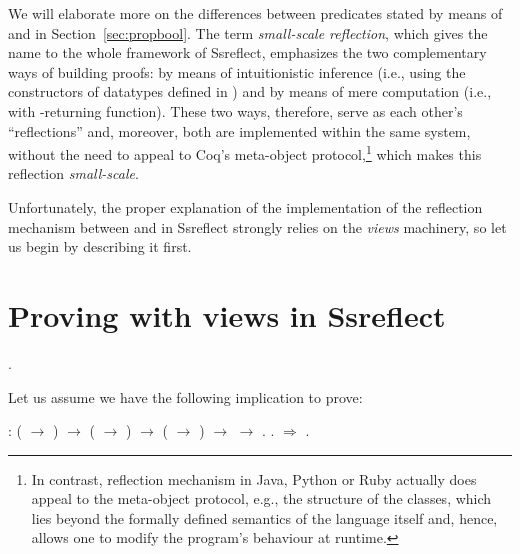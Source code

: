 We will elaborate more on the differences between predicates stated by
means of  and  in Section~\ref{sec:propbool}. The term
\textit{small-scale reflection}, which gives the name to the whole framework
of Ssreflect, emphasizes the two complementary ways of building
proofs: by means of intuitionistic inference (i.e., using the
constructors of datatypes defined in ) and by means of mere
computation (i.e., with -returning function). These two ways,
therefore, serve as each other's ``reflections'' and, moreover, both are
implemented within the same system, without the need to appeal to
Coq's meta-object protocol,\footnote{In contrast, reflection
mechanism in Java, Python or Ruby actually does appeal to the
meta-object protocol, e.g.,  the structure
of the classes, which lies beyond the formally defined semantics of
the language itself and, hence, allows one to modify the program's
behaviour at runtime.} which makes this reflection \textit{small-scale}.


Unfortunately, the proper explanation of the implementation of the
reflection mechanism between  and  in Ssreflect strongly
relies on the \textit{views} machinery, so let us begin by describing it
first.


\newpage


\section{Proving with views in Ssreflect}


\label{sec:views}


\begin{coqdoccode}
\coqdocemptyline
\coqdocnoindent
{} \coqdoceol
\coqdocnoindent
{}      .\coqdoceol
\coqdocemptyline
\coqdocemptyline
\end{coqdoccode}


Let us assume we have the following implication to prove:


\begin{coqdoccode}
\coqdocemptyline
\coqdocnoindent
{}     : ( \ensuremath{\rightarrow} ) \ensuremath{\rightarrow} ( \ensuremath{\rightarrow} ) \ensuremath{\rightarrow} ( \ensuremath{\rightarrow} ) \ensuremath{\rightarrow}  \ensuremath{\rightarrow} .\coqdoceol
\coqdocnoindent
{}.\coqdoceol
\coqdocnoindent
{}\ensuremath{\Rightarrow}  .\coqdoceol
\coqdocemptyline
\end{coqdoccode}



